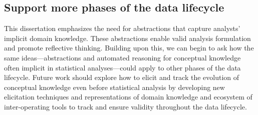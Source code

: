 \subsection{Support more phases of the data lifecycle}
\begin{comment}
This dissertation identifies the need for improved abstractions for authoring
statistical analyses. I argue that the appropriate abstractions should capture
the implicit domain knowledge analysts bring to their data and show the benefits
to users for doing so: valid statistical analysis formulation and increased
reflection among analysts about their domain and data. From an engineering
perspective, these abstractions allow tool designers to separate the conceptual
and statistical concerns involved in data analysis, using Tea and Tisane as
platforms for experimenting with alternative statistical model derivations and
formulations. Given that implicit assumptions about a domain pervade the entire
data lifecycle, what if we could take a similar approach throughout? What would
the appropriate data structures for capturing domain knowledge look like at each
phase? How could a new ecosystem of software tools use these representations
such that the evolution of conceptual knowledge could be tracked and traced in
meaningful ways.  -- some research questions to ask/address

A fertile area to try this integration is in connecting statistical analysis
with visual analysis
\end{comment}

This dissertation emphasizes the need for abstractions that capture analysts'
implicit domain knowledge. These abstractions enable valid analysis formulation
and promote reflective thinking. Building upon this, we can begin to ask how the
same ideas---abstractions and automated reasoning for conceptual knowledge often
implicit in statistical analyses---could apply to other phases of the data
lifecycle. Future work should explore how to elicit and track the evolution of
conceptual knowledge even before statistical analysis by developing new
elicitation techniques and representations of domain knowledge and ecosystem of
inter-operating tools to track and ensure validity throughout the data lifecycle. 


